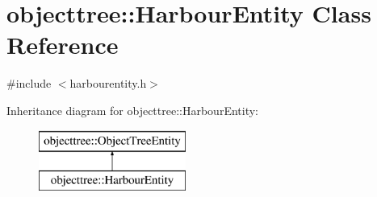 \hypertarget{classobjecttree_1_1_harbour_entity}{}\section{objecttree\+::Harbour\+Entity Class Reference}
\label{classobjecttree_1_1_harbour_entity}


{\ttfamily \#include $<$harbourentity.\+h$>$}

Inheritance diagram for objecttree\+::Harbour\+Entity\+:\begin{figure}[H]
\begin{center}
\leavevmode
\includegraphics[height=2.000000cm]{dd/d53/classobjecttree_1_1_harbour_entity}
\end{center}
\end{figure}
